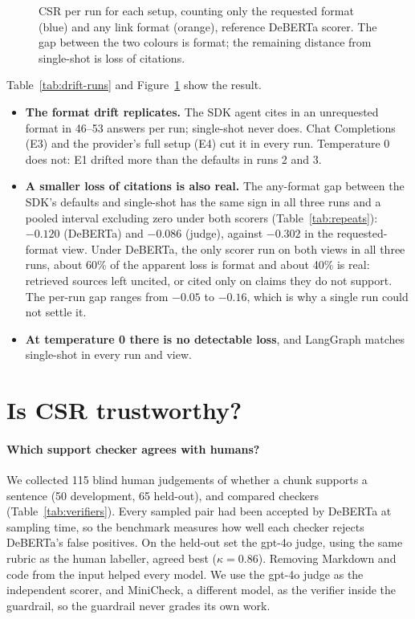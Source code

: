 \documentclass[11pt]{article}
\begin{document}
\begin{figure}[t]
\centering

\caption{CSR per run for each setup, counting only the requested format (blue) and any link format
(orange), reference DeBERTa scorer. The gap between the two colours is format; the remaining
distance from single-shot is loss of citations.}
\label{fig:csr}
\end{figure}

Table~\ref{tab:drift-runs} and Figure~\ref{fig:csr} show the result.

\begin{itemize}
\item \textbf{The format drift replicates.} The SDK agent cites in an unrequested format in 46--53
answers per run; single-shot never does. Chat Completions (E3) and the provider's full setup (E4)
cut it in every run. Temperature 0 does not: E1 drifted more than the defaults in runs 2 and 3.
\item \textbf{A smaller loss of citations is also real.} The any-format gap between the SDK's
defaults and single-shot has the same sign in all three runs and a pooled interval excluding zero
under both scorers (Table~\ref{tab:repeats}): $-0.120$ (DeBERTa) and $-0.086$ (judge), against
$-0.302$ in the requested-format view. Under DeBERTa, the only scorer run on both views in all three runs, about 60\% of the apparent
loss is format and about 40\% is real: retrieved sources left uncited, or cited only on claims they
do not support. The per-run gap ranges from $-0.05$ to $-0.16$, which is why a
single run could not settle it.
\item \textbf{At temperature 0 there is no detectable loss}, and LangGraph matches single-shot in
every run and view.
\end{itemize}

\section{Is CSR trustworthy?}
\label{sec:validation}

\paragraph{Which support checker agrees with humans?} We collected 115 blind human judgements of
whether a chunk supports a sentence (50 development, 65 held-out), and compared checkers
(Table~\ref{tab:verifiers}). Every sampled pair had been accepted by DeBERTa at sampling time, so
the benchmark measures how well each checker rejects DeBERTa's false positives. On the held-out
set the gpt-4o judge, using the same rubric as the human labeller, agreed best ($\kappa = 0.86$).
Removing Markdown and code from the input helped every model. We use the gpt-4o judge as the
independent scorer, and MiniCheck, a different model, as the verifier inside the guardrail, so the
guardrail never grades its own work.
\end{document}
